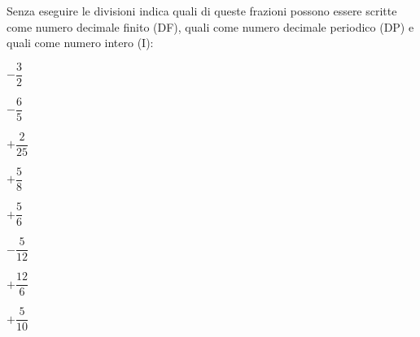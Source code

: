 \begin{esercizio}
\label{ese:3.19}
 Senza eseguire le divisioni indica quali di queste frazioni possono essere 
 scritte come numero decimale finito (DF), quali come numero decimale 
 periodico (DP) e quali come numero intero (I):
 
\begin{htmulticols}{2}
 \TabPositions{15mm}
 \begin{enumeratees}
\spazielenx
 \item \(-\dfrac{3}{2}~\)~~~~~~~~~
 \item \(-\dfrac{6}{5}~\)~~~~~~~~~
 \item \(+\dfrac{2}{25}\)~~~~~~~~~
 \item \(+\dfrac{5}{8}~\)~~~~~~~~~
 \item \(+\dfrac{5}{6}~\)~~~~~~~~~
 \item \(-\dfrac{5}{12}\)~~~~~~~~~
 \item \(+\dfrac{12}{6}\)~~~~~~~~~
 \item \(+\dfrac{5}{10}\)~~~~~~~~~
 \end{enumeratees}
\end{htmulticols}
\end{esercizio}

